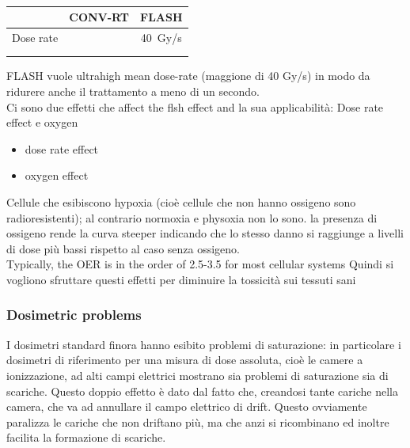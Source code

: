     \begin{table}
        \begin{center}
        \begin{tabular}{|c | c |c |}
        \hline
        & CONV-RT & FLASH \\
        \hline
        \hline
        Dose rate & & \SI{40}{Gy/s}\\
         & & \\
         & & \\
        
        \end{tabular}
        \caption{}
        \label{tab:}
        \end{center}
     \end{table}

    FLASH vuole ultrahigh mean dose-rate (maggione di 40 Gy/s) in modo da ridurere anche il trattamento a meno di un secondo. \\


    Ci sono due effetti che affect the flsh effect and la sua applicabilità: Dose rate effect e oxygen\\
    \begin{itemize}
        \item dose rate effect
        \item oxygen effect
    \end{itemize}    

    Cellule che esibiscono hypoxia (cioè cellule che non hanno ossigeno sono radioresistenti); al contrario normoxia e physoxia non lo sono.
    la presenza di ossigeno rende la curva steeper indicando che lo stesso danno si raggiunge a livelli di dose più bassi rispetto al caso senza ossigeno.\\

    Typically, the OER is in the order of 2.5-3.5 for most cellular systems
    Quindi si vogliono sfruttare questi effetti per diminuire la tossicità sui tessuti sani

    \subsubsection{Dosimetric problems}
    I dosimetri standard finora hanno esibito problemi di saturazione: in particolare i dosimetri di riferimento per una misura di dose assoluta, cioè le camere a ionizzazione, ad alti campi elettrici mostrano sia problemi di saturazione sia di scariche. 
    Questo doppio effetto è dato dal fatto che, creandosi tante cariche nella camera, che va ad annullare il campo elettrico di drift. Questo ovviamente paralizza le cariche che non driftano più, ma che anzi si ricombinano ed inoltre facilita la formazione di scariche. 

